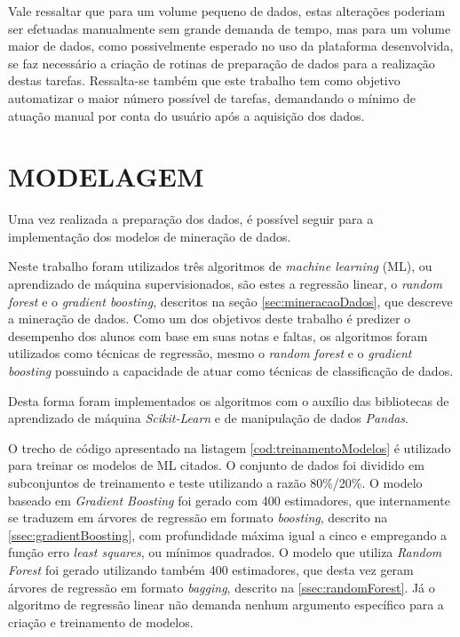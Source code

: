Vale ressaltar que para um volume pequeno de dados, estas alterações poderiam ser efetuadas manualmente sem grande demanda de tempo, mas para um volume maior de dados, como possivelmente esperado no uso da plataforma desenvolvida, se faz necessário a criação de rotinas de preparação de dados para a realização destas tarefas.
Ressalta-se também que este trabalho tem como objetivo automatizar o maior número possível de tarefas, demandando o mínimo de atuação manual por conta do usuário após a aquisição dos dados.

\section{MODELAGEM}
\label{sec:modelagem}
Uma vez realizada a preparação dos dados, é possível seguir para a implementação dos modelos de mineração de dados.

Neste trabalho foram utilizados três algoritmos de \textit{machine learning} (ML), ou aprendizado de máquina supervisionados, são estes a regressão linear, o \textit{random forest} e o \textit{gradient boosting}, descritos na seção \ref{sec:mineracaoDados}, que descreve a mineração de dados.
Como um dos objetivos deste trabalho é predizer o desempenho dos alunos com base em suas notas e faltas, os algoritmos foram utilizados como técnicas de regressão, mesmo o \textit{random forest} e o \textit{gradient boosting} possuindo a capacidade de atuar como técnicas de classificação de dados.

Desta forma foram implementados os algoritmos com o auxílio das bibliotecas de aprendizado de máquina \textit{Scikit-Learn} e de manipulação de dados \textit{Pandas}.

O trecho de código apresentado na listagem \ref{cod:treinamentoModelos} é utilizado para treinar os modelos de ML citados.
O conjunto de dados foi dividido em subconjuntos de treinamento e teste utilizando a razão 80\%/20\%.
O modelo baseado em \textit{Gradient Boosting} foi gerado com 400 estimadores, que internamente se traduzem em árvores de regressão em formato \textit{boosting}, descrito na \ref{ssec:gradientBoosting}, com profundidade máxima igual a cinco e empregando a função erro \textit{least squares}, ou mínimos quadrados.
O modelo que utiliza \textit{Random Forest} foi gerado utilizando também 400 estimadores, que desta vez geram árvores de regressão em formato \textit{bagging}, descrito na \ref{ssec:randomForest}.
Já o algoritmo de regressão linear não demanda nenhum argumento específico para a criação e treinamento de modelos.

